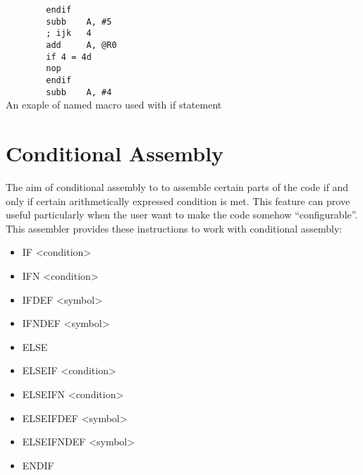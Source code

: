 \begin{code}[h!]
            \verb'        '{\color{highlight_directive}\verb'endif'}\\
            \verb'        '{\color{highlight_instruction}\verb'subb'}\verb'    '{\color{highlight_sfr}\verb'A'}{\color{highlight_oper_sep}\verb','}\verb' '{\color{highlight_imm_unknown}\verb'#5'}\\
            \verb'        '{\color{highlight_comment}\verb'; ijk   4'}\\
            \verb'        '{\color{highlight_instruction}\verb'add'}\verb'     '{\color{highlight_sfr}\verb'A'}{\color{highlight_oper_sep}\verb','}\verb' '{\color{highlight_indirect}\verb'@R0'}\\
            \verb'        '{\color{highlight_directive}\verb'if'}\verb' '{\color{highlight_unknown_base}\verb'4'}\verb' '{\color{highlight_symbol}\verb'='}\verb' '{\color{highlight_dec}\verb'4d'}\\
            \verb'        '{\color{highlight_instruction}\verb'nop'}\\
            \verb'        '{\color{highlight_directive}\verb'endif'}\\
            \verb'        '{\color{highlight_instruction}\verb'subb'}\verb'    '{\color{highlight_sfr}\verb'A'}{\color{highlight_oper_sep}\verb','}\verb' '{\color{highlight_imm_unknown}\verb'#4'}\\
            \caption{An exaple of named macro used with if statement}
    \end{code}

\section{Conditional Assembly}
        The aim of conditional assembly to to assemble certain parts of the code if and only if certain arithmetically expressed condition is met.
        This feature can prove useful particularly when the user want to make the code somehow ``configurable''. This assembler provides these instructions
        to work with conditional assembly:
        \begin{itemize}
                \setlength{\itemsep}{-3pt}
                \item IF <condition>
                \item IFN <condition>
                \item IFDEF <symbol>
                \item IFNDEF <symbol>
                \item ELSE
                \item ELSEIF <condition>
                \item ELSEIFN <condition>
                \item ELSEIFDEF <symbol>
                \item ELSEIFNDEF <symbol>
                \item ENDIF
        \end{itemize}

